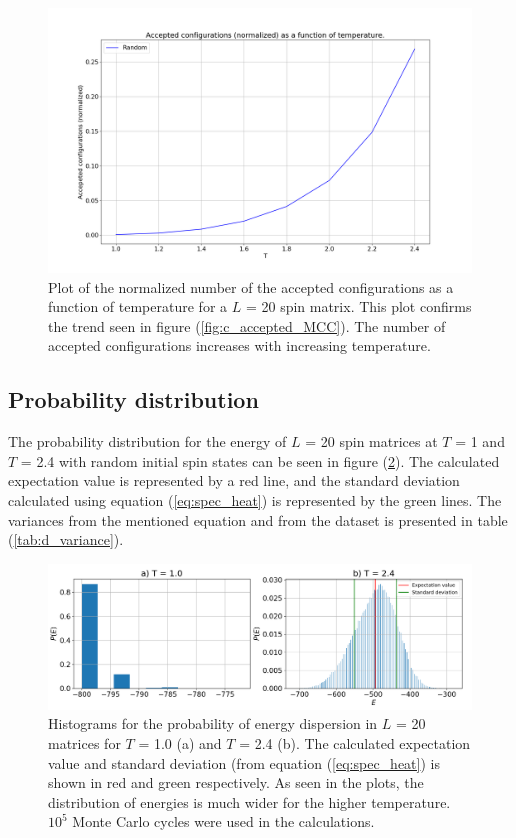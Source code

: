 \documentclass[10pt,a4paper,titlepage]{article}
\begin{document}
\begin{figure}[]
\centering
\centering\includegraphics[scale=0.3]{taskc3_acc_vs_T_L20_1e5.png}
\caption{Plot of the normalized number of the accepted configurations as a function of temperature for a $L$ = 20 spin matrix. This plot confirms the trend seen in figure (\ref{fig:c_accepted_MCC}). The number of accepted configurations increases with increasing temperature.   \label{fig:c_accepted_T}}
\end{figure}

\subsection{Probability distribution}
The probability distribution for the energy of $L$ = 20 spin matrices at $T$ = 1 and $T$ = 2.4 with random initial spin states can be seen in figure (\ref{fig:d_prob}). The calculated expectation value is represented by a red line, and the standard deviation calculated using equation (\ref{eq:spec_heat}) is represented by the green lines. 
The variances from the mentioned equation and from the dataset is presented in table (\ref{tab:d_variance}).

\begin{figure}[]
\centering
\centering\includegraphics[scale=0.4]{taskd_P(E)_vs_E_1e5_L20.png}
\caption{Histograms for the probability of energy dispersion in $L$ = 20 matrices for $T$ = 1.0 (a) and $T$ = 2.4 (b). The calculated expectation value and standard deviation (from equation (\ref{eq:spec_heat}) is shown in red and green respectively. As seen in the plots, the distribution of energies is much wider for the higher temperature. $10^5$ Monte Carlo cycles were used in the calculations.   \label{fig:d_prob}}
\end{figure}
\end{document}
